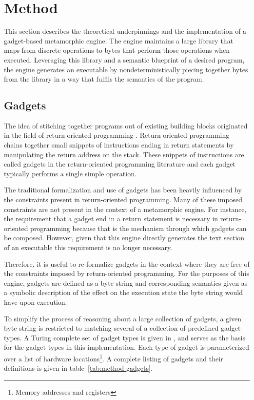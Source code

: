 \chapter{Method}

    This section describes the theoretical underpinnings and the implementation
    of a gadget-based metamorphic engine. The engine maintains a large library
    that maps from discrete operations to bytes that perform those operations
    when executed. Leveraging this library and a semantic blueprint of a desired
    program, the engine generates an executable by nondeterministically piecing
    together bytes from the library in a way that fulfils the semantics of the
    program.

    \section{Gadgets}
    
    The idea of stitching together programs out of existing building blocks
    originated in the field of return-oriented programming \cite{rop_geo}.
    Return-oriented programming chains together small snippets of instructions
    ending in return statements by manipulating the return address on the stack.
    These snippets of instructions are called gadgets in the return-oriented
    programming literature and each gadget typically performs a single simple
    operation.

    The traditional formalization and use of gadgets has been heavily influenced
    by the constraints present in return-oriented programming. Many of these
    imposed constraints are not present in the context of a metamorphic engine.
    For instance, the requirement that a gadget end in a return statement is
    necessary in return-oriented programming because that is the mechanism
    through which gadgets can be composed. However, given that this engine
    directly generates the text section of an executable this requirement is no
    longer necessary.

    Therefore, it is useful to re-formalize gadgets in the context where they
    are free of the constraints imposed by return-oriented programming. For the
    purposes of this engine, gadgets are defined as a byte string and
    corresponding semantics given as a symbolic description of the effect on the
    execution state the byte string would have upon execution.

    To simplify the process of reasoning about a large collection of gadgets, a
    given byte string is restricted to matching several of a collection of
    predefined gadget types. A Turing complete set of gadget types is given in
    \cite{franken}, and serves as the basis for the gadget types in this
    implementation. Each type of gadget is parameterized over a list of hardware
    locations\footnote{Memory addresses and registers}. A complete listing of
    gadgets and their definitions is given in table~\ref{tab:method-gadgets}.

